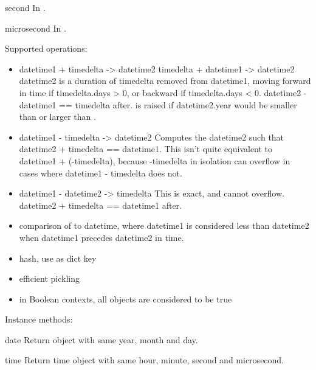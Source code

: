 \begin{memberdesc}{second}
In .
\end{memberdesc}

\begin{memberdesc}{microsecond}
In .
\end{memberdesc}

Supported operations:

\begin{itemize}
  \item
    datetime1 + timedelta -> datetime2
    timedelta + datetime1 -> datetime2
    datetime2 is a duration of timedelta removed from datetime1, moving
    forward in time if timedelta.days > 0, or backward if
    timedelta.days < 0.  datetime2 - datetime1 == timedelta after.
     is raised if datetime2.year would be
    smaller than  or larger than .

  \item
    datetime1 - timedelta -> datetime2
    Computes the datetime2 such that datetime2 + timedelta == datetime1.
    This isn't quite equivalent to datetime1 + (-timedelta), because
    -timedelta in isolation can overflow in cases where
    datetime1 - timedelta does not.

  \item
    datetime1 - datetime2 -> timedelta
    This is exact, and cannot overflow.
    datetime2 + timedelta == datetime1 after.

  \item
    comparison of  to datetime, where datetime1 is
    considered less than datetime2 when datetime1 precedes datetime2
    in time.

  \item
    hash, use as dict key

  \item
    efficient pickling

  \item
    in Boolean contexts, all  objects are considered
    to be true
\end{itemize}

Instance methods:

\begin{methoddesc}{date}{}
    Return  object with same year, month and day.
\end{methoddesc}

\begin{methoddesc}{time}{}
    Return time object with same hour, minute, second and microsecond.
\end{methoddesc}

